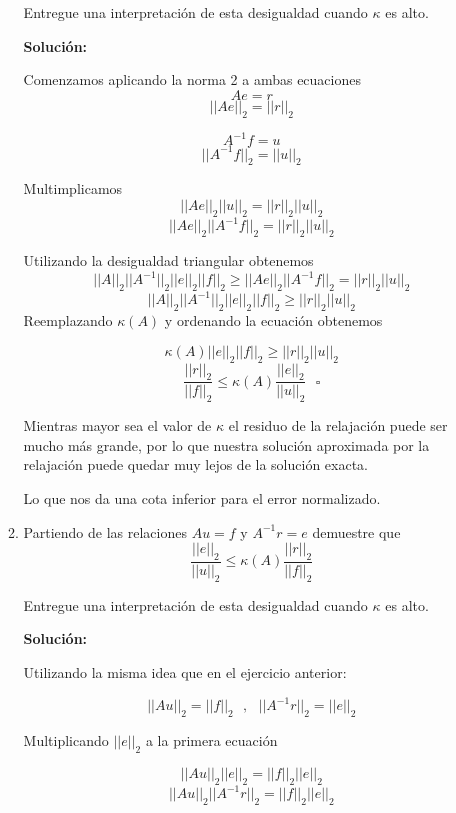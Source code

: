 \documentclass[spanish]{article}
\begin{document}
\begin{enumerate}
\begin{enumerate}
           Entregue una interpretación de esta desigualdad cuando $\kappa$ es alto.
            
            \textbf{Solución:}
            
            Comenzamos aplicando la norma 2 a ambas ecuaciones
            $$Ae = r$$
            $$||Ae||_2 = ||r||_2$$
            
            $$    A^{-1}f = u $$
            $$    ||A^{-1}f||_2 = ||u||_2 $$
            
            Multimplicamos 
            $$  ||Ae||_2 ||u||_2 = ||r||_2  ||u||_2 $$
            $$ ||Ae||_2 ||A^{-1}f||_2 = ||r||_2  ||u||_2  $$
            
            Utilizando la desigualdad triangular obtenemos
           $$ ||A||_2 ||A^{-1}||_2 ||e||_2 ||f||_2 \geq ||Ae||_2 ||A^{-1}f||_2 = ||r||_2  ||u||_2 $$ 
           $$ ||A||_2 ||A^{-1}||_2 ||e||_2 ||f||_2 \geq ||r||_2  ||u||_2 $$
           Reemplazando $\kappa(A)$ y ordenando la ecuación obtenemos
           
           $$ \kappa(A) ||e||_2 ||f||_2 \geq ||r||_2  ||u||_2 $$
           $$  \frac{||r||_2}{||f||_2}\leq \kappa(A)\frac{ ||e||_2 }{ ||u||_2 } \ \ \  \square $$
        
           Mientras mayor sea el valor de $\kappa$ el residuo de la relajación puede ser mucho más grande, por lo que nuestra
           solución aproximada por la relajación puede quedar muy lejos de la solución exacta.
           
           Lo que nos da una cota inferior para el error normalizado.
        
           \item Partiendo de las relaciones $Au = f$ y $A^{-1}r = e$ demuestre que 
           $$\frac{||e||_2}{||u||_2} \leq \kappa(A) \frac{||r||_2}{||f||_2}$$
           
           Entregue una interpretación de esta desigualdad cuando $\kappa$ es alto.
    
        \textbf{Solución:}
        
        Utilizando la misma idea que en el ejercicio anterior:
        
        $$||Au||_2 = ||f||_2 \ \ \  , \ \ \ ||A^{-1}r||_2 = ||e||_2 $$
        
        Multiplicando $||e||_2$ a la primera ecuación
        
        $$||Au||_2 ||e||_2 = ||f||_2 ||e||_2 $$
        $$ ||Au||_2 ||A^{-1}r||_2 = ||f||_2 ||e||_2 $$
        

\end{enumerate}
\end{enumerate}
\end{document}
